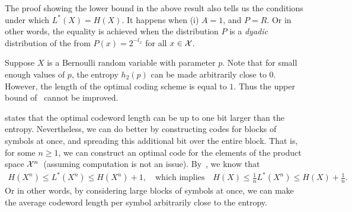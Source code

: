     \begin{remark}
        The proof showing the lower bound in the above result also tells us the conditions under which $L^*(X) = H(X)$. It happens when (i) $A=1$, and $P=R$. Or in other words, the equality is achieved when the distribution $P$ is a \emph{dyadic} distribution of the from $P(x) = 2^{-l_x}$ for all $x \in \mathcal{X}$. 
    \end{remark}
    \begin{remark}
        Suppose $X$ is a Bernoulli random variable with parameter $p$. Note that for small enough values of $p$, the entropy $h_2(p)$ can be made arbitrarily close to $0$. However, the length of the optimal coding scheme is equal to $1$. Thus the upper bound of~ cannot be improved. 
    \end{remark}

    \begin{remark}
        \label{remark:block-source-codes}
         states that the optimal codeword length can be up to one bit larger than the entropy. Nevertheless, we can do better by constructing codes for blocks of symbols at once, and spreading this additional bit over the entire block. That is, for some $n \geq 1$, we can construct an optimal code for the elements of the product space $\mathcal{X}^n$~(assuming computation is not an issue). By~, we know that 
        \begin{align}
            H(X^n) \leq L^*(X^n) \leq H(X^n) + 1, \quad \text{which implies} \quad H(X) \leq \frac{1}{n} L^*(X^n) \leq H(X) + \frac{1}{n}. 
        \end{align}
        Or in other words, by considering large blocks of symbols at once, we can make the average codeword length per symbol arbitrarily close to the entropy. 
    \end{remark}

